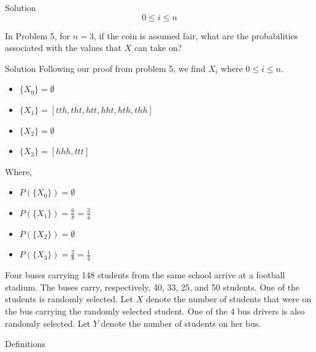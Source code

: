 \documentclass{article}
\begin{document}
\begin{spacing}{1.1}
\begin{homeworkProblem}
\begin{homeworkSection}{Solution}
    \[0 \le i \le n\]

  \end{homeworkSection}
\end{homeworkProblem}
\newpage
\begin{homeworkProblem}
In Problem 5, for $n = 3$, if the coin is assumed fair, what are 
the probabilities associated with the values that $X$ can take on?
  \begin{homeworkSection}{Solution}
    Following our proof from problem 5, we find $X_i$ where 
    $0 \le i \le n$.
    \begin{itemize}
      \item $\{X_0\} = \emptyset$
      \item $\{X_1\} = [tth, tht, htt, hht, hth, thh]$
      \item $\{X_2\} = \emptyset$
      \item $\{X_3\} = [hhh,ttt]$
    \end{itemize}
    Where,
    \begin{itemize}
      \item $P( \{X_0\}) = \emptyset$
      \item $P( \{X_1\}) = \frac{ 6}{ 8} = \frac{ 3}{ 4}$
      \item $P( \{X_2\}) = \emptyset$
      \item $P( \{X_3\}) = \frac{ 2}{ 8} = \frac{ 1}{ 4}$
    \end{itemize}
  \end{homeworkSection}
\end{homeworkProblem}
\newpage
\begin{homeworkProblem}
  Four buses carrying 148 students from the same school arrive at 
  a football stadium. The buses carry, respectively, 40, 33, 25, 
  and 50 students. One of the students is randomly selected. 
  Let $X$ denote the number of students that were on the bus carrying 
  the randomly selected student. One of the 4 bus drivers is also 
  randomly selected. Let $Y$ denote the number of students on her bus.


  \begin{homeworkSection}{Definitions}


\end{homeworkSection}
\end{homeworkProblem}
\end{spacing}
\end{document}
